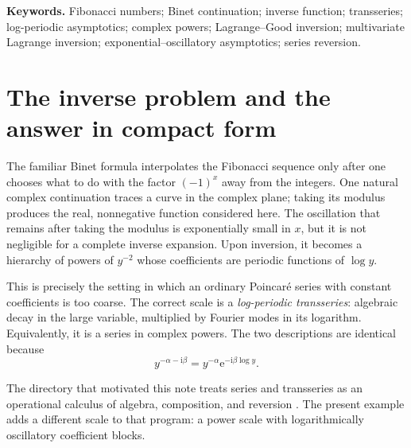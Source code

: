\documentclass[11pt,oneside]{article}
\theoremstyle{plain}
\theoremstyle{definition}
\theoremstyle{remark}
\newcommand{\e}{\mathrm{e}}
\newcommand{\ii}{\mathrm{i}}
\begin{document}
\noindent\textbf{Keywords.}
Fibonacci numbers; Binet continuation; inverse function; transseries;
log-periodic asymptotics; complex powers; Lagrange--Good inversion;
multivariate Lagrange inversion; exponential--oscillatory asymptotics;
series reversion.

{\small\tableofcontents}
\clearpage

\section{The inverse problem and the answer in compact form}
\label{sec:intro}

The familiar Binet formula interpolates the Fibonacci sequence only after one
chooses what to do with the factor \((-1)^x\) away from the integers.  One
natural complex continuation traces a curve in the complex plane; taking its
modulus produces the real, nonnegative function considered here.  The
oscillation that remains after taking the modulus is exponentially small in
\(x\), but it is not negligible for a complete inverse expansion.  Upon
inversion, it becomes a hierarchy of powers of \(y^{-2}\) whose coefficients
are periodic functions of \(\log y\).

This is precisely the setting in which an ordinary Poincar\'e series with
constant coefficients is too coarse.  The correct scale is a
\emph{log-periodic transseries}: algebraic decay in the large variable,
multiplied by Fourier modes in its logarithm.  Equivalently, it is a series in
complex powers.  The two descriptions are identical because
\[
 y^{-\alpha-\ii\beta}=y^{-\alpha}\e^{-\ii\beta\log y}.
\]

The directory that motivated this note treats series and transseries as an
operational calculus of algebra, composition, and reversion
\cite{ProveItSeriesTransseries}.  The present example adds a different scale to
that program: a power scale with logarithmically oscillatory coefficient
blocks.
\end{document}
